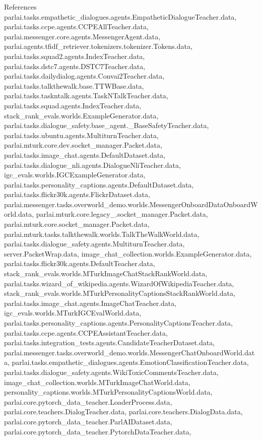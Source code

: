 References parlai.\+tasks.\+empathetic\+\_\+dialogues.\+agents.\+Empathetic\+Dialogue\+Teacher.\+data, parlai.\+tasks.\+ccpe.\+agents.\+C\+C\+P\+E\+All\+Teacher.\+data, parlai.\+messenger.\+core.\+agents.\+Messenger\+Agent.\+data, parlai.\+agents.\+tfidf\+\_\+retriever.\+tokenizers.\+tokenizer.\+Tokens.\+data, parlai.\+tasks.\+squad2.\+agents.\+Index\+Teacher.\+data, parlai.\+tasks.\+dstc7.\+agents.\+D\+S\+T\+C7\+Teacher.\+data, parlai.\+tasks.\+dailydialog.\+agents.\+Convai2\+Teacher.\+data, parlai.\+tasks.\+talkthewalk.\+base.\+T\+T\+W\+Base.\+data, parlai.\+tasks.\+taskntalk.\+agents.\+Task\+N\+Talk\+Teacher.\+data, parlai.\+tasks.\+squad.\+agents.\+Index\+Teacher.\+data, stack\+\_\+rank\+\_\+evals.\+worlds.\+Example\+Generator.\+data, parlai.\+tasks.\+dialogue\+\_\+safety.\+base\+\_\+agent.\+\_\+\+Base\+Safety\+Teacher.\+data, parlai.\+tasks.\+ubuntu.\+agents.\+Multiturn\+Teacher.\+data, parlai.\+mturk.\+core.\+dev.\+socket\+\_\+manager.\+Packet.\+data, parlai.\+tasks.\+image\+\_\+chat.\+agents.\+Default\+Dataset.\+data, parlai.\+tasks.\+dialogue\+\_\+nli.\+agents.\+Dialogue\+Nli\+Teacher.\+data, igc\+\_\+evals.\+worlds.\+I\+G\+C\+Example\+Generator.\+data, parlai.\+tasks.\+personality\+\_\+captions.\+agents.\+Default\+Dataset.\+data, parlai.\+tasks.\+flickr30k.\+agents.\+Flickr\+Dataset.\+data, parlai.\+messenger.\+tasks.\+overworld\+\_\+demo.\+worlds.\+Messenger\+Onboard\+Data\+Onboard\+World.\+data, parlai.\+mturk.\+core.\+legacy\+\_.\+socket\+\_\+manager.\+Packet.\+data, parlai.\+mturk.\+core.\+socket\+\_\+manager.\+Packet.\+data, parlai.\+mturk.\+tasks.\+talkthewalk.\+worlds.\+Talk\+The\+Walk\+World.\+data, parlai.\+tasks.\+dialogue\+\_\+safety.\+agents.\+Multiturn\+Teacher.\+data, server.\+Packet\+Wrap.\+data, image\+\_\+chat\+\_\+collection.\+worlds.\+Example\+Generator.\+data, parlai.\+tasks.\+flickr30k.\+agents.\+Default\+Teacher.\+data, stack\+\_\+rank\+\_\+evals.\+worlds.\+M\+Turk\+Image\+Chat\+Stack\+Rank\+World.\+data, parlai.\+tasks.\+wizard\+\_\+of\+\_\+wikipedia.\+agents.\+Wizard\+Of\+Wikipedia\+Teacher.\+data, stack\+\_\+rank\+\_\+evals.\+worlds.\+M\+Turk\+Personality\+Captions\+Stack\+Rank\+World.\+data, parlai.\+tasks.\+image\+\_\+chat.\+agents.\+Image\+Chat\+Teacher.\+data, igc\+\_\+evals.\+worlds.\+M\+Turk\+I\+G\+C\+Eval\+World.\+data, parlai.\+tasks.\+personality\+\_\+captions.\+agents.\+Personality\+Captions\+Teacher.\+data, parlai.\+tasks.\+ccpe.\+agents.\+C\+C\+P\+E\+Assistant\+Teacher.\+data, parlai.\+tasks.\+integration\+\_\+tests.\+agents.\+Candidate\+Teacher\+Dataset.\+data, parlai.\+messenger.\+tasks.\+overworld\+\_\+demo.\+worlds.\+Messenger\+Chat\+Onboard\+World.\+data, parlai.\+tasks.\+empathetic\+\_\+dialogues.\+agents.\+Emotion\+Classification\+Teacher.\+data, parlai.\+tasks.\+dialogue\+\_\+safety.\+agents.\+Wiki\+Toxic\+Comments\+Teacher.\+data, image\+\_\+chat\+\_\+collection.\+worlds.\+M\+Turk\+Image\+Chat\+World.\+data, personality\+\_\+captions.\+worlds.\+M\+Turk\+Personality\+Captions\+World.\+data, parlai.\+core.\+pytorch\+\_\+data\+\_\+teacher.\+Loader\+Process.\+data, parlai.\+core.\+teachers.\+Dialog\+Teacher.\+data, parlai.\+core.\+teachers.\+Dialog\+Data.\+data, parlai.\+core.\+pytorch\+\_\+data\+\_\+teacher.\+Parl\+A\+I\+Dataset.\+data, parlai.\+core.\+pytorch\+\_\+data\+\_\+teacher.\+Pytorch\+Data\+Teacher.\+data, 